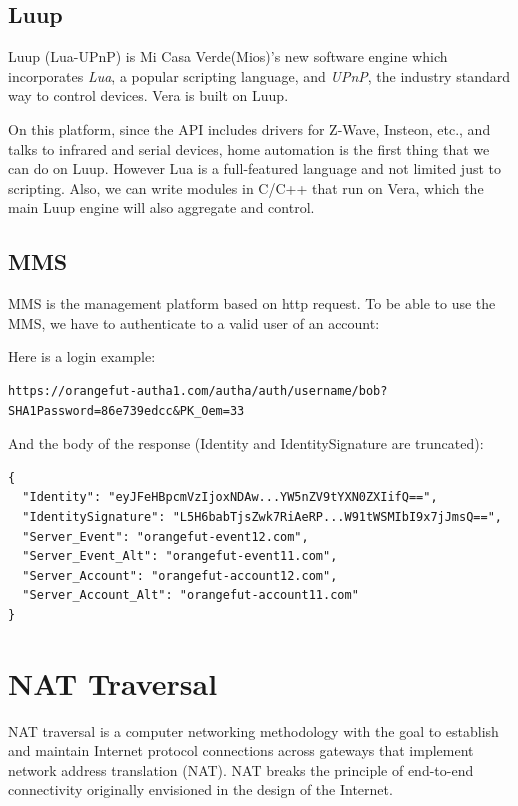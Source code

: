 \subsection{Luup}
Luup (Lua-UPnP) is Mi Casa Verde(Mios)’s new software engine which incorporates \textit{Lua}, a popular scripting language, and \textit{UPnP}, the industry standard way to control devices. Vera is built on Luup.

On this platform, since the API includes drivers for Z-Wave, Insteon, etc., and talks to infrared and serial devices, home automation is the first thing that we can do on Luup. However Lua is a full-featured language and not limited just to scripting. Also, we can write modules in C/C++ that run on Vera, which the main Luup engine will also aggregate and control.

\subsection{MMS}
MMS is the management platform based on http request. To be able to use the MMS, we have to authenticate to a valid user of an account:

Here is a login example:
\begin{lstlisting}[mathescape]
	https://orangefut-autha1.com/autha/auth/username/bob?SHA1Password=86e739edcc&PK_Oem=33
\end{lstlisting}

And the body of the response (Identity and IdentitySignature are truncated):

\begin{lstlisting}[mathescape]
{
  "Identity": "eyJFeHBpcmVzIjoxNDAw...YW5nZV9tYXN0ZXIifQ==",
  "IdentitySignature": "L5H6babTjsZwk7RiAeRP...W91tWSMIbI9x7jJmsQ==",
  "Server_Event": "orangefut-event12.com",
  "Server_Event_Alt": "orangefut-event11.com",
  "Server_Account": "orangefut-account12.com",
  "Server_Account_Alt": "orangefut-account11.com"
}
\end{lstlisting}
\section{NAT Traversal}
NAT traversal is a computer networking methodology with the goal to establish and maintain Internet protocol connections across gateways that implement network address translation (NAT). NAT breaks the principle of end-to-end connectivity originally envisioned in the design of the Internet.

